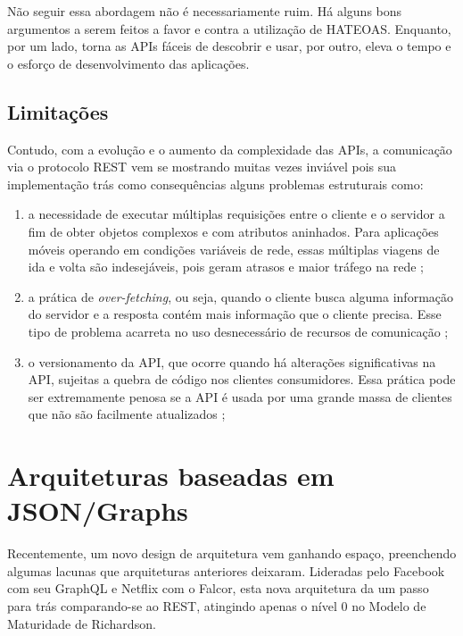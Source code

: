 Não seguir essa abordagem não é necessariamente ruim. Há alguns bons argumentos a serem feitos a favor e contra a utilização de HATEOAS. Enquanto, por um lado, torna as APIs fáceis de descobrir e usar, por outro, eleva o tempo e o esforço de desenvolvimento das aplicações.

\subsection{Limitações}

Contudo, com a evolução e o aumento da complexidade das APIs, a comunicação via o protocolo REST vem se mostrando muitas vezes inviável pois sua implementação trás como consequências alguns problemas estruturais como:

\begin{enumerate}[label=\alph*)]

\item a necessidade de executar múltiplas requisições entre o cliente e o servidor a fim de obter objetos complexos e com atributos aninhados. Para aplicações móveis operando em condições variáveis de rede, essas múltiplas viagens de ida e volta são indesejáveis, pois geram atrasos e maior tráfego na rede \cite{graphQl-overview};

\item a prática de \textit{over-fetching}, ou seja, quando o cliente busca alguma informação do servidor e a resposta contém mais informação que o cliente precisa. Esse tipo de problema acarreta no uso desnecessário de recursos de comunicação  \cite{efficient-data-communication};

\item o versionamento da API, que ocorre quando há alterações significativas na API, sujeitas a quebra de código nos clientes consumidores. Essa prática pode ser extremamente penosa se a API é usada por uma grande massa de clientes que não são facilmente atualizados \cite{api-versioning};

\end{enumerate}

\section{Arquiteturas baseadas em JSON/Graphs}\label{sec:graph}

Recentemente, um novo design de arquitetura vem ganhando espaço, preenchendo algumas lacunas que arquiteturas anteriores deixaram. Lideradas pelo Facebook com seu GraphQL e Netflix com o Falcor, esta nova arquitetura da um passo para trás comparando-se ao REST, atingindo apenas o nível 0 no Modelo de Maturidade de Richardson. 

